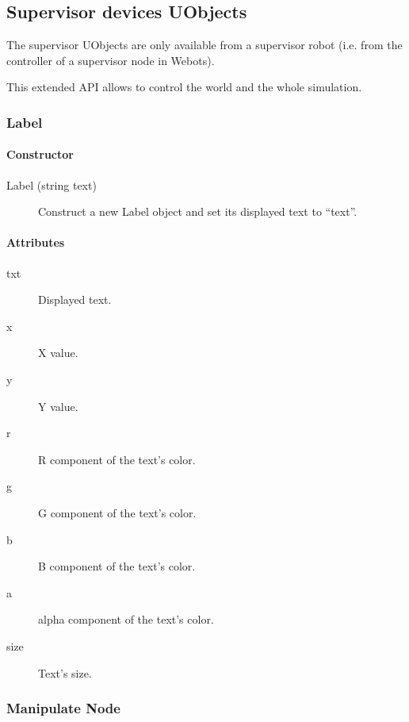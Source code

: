 \subsection{Supervisor devices UObjects}
\label{webots.uobjects.supervisor}%

 The supervisor UObjects are only available from a supervisor
robot (i.e. from the controller of a supervisor node in Webots).


 This extended API allows \urbi to control the world and the whole
simulation.


\subsubsection{Label}
\label{webots.uobjects.supervisor.label}%

\paragraph{Constructor}
\label{webots.uobjects.supervisor.label.constructor}%

\noindent
\begin{description}
\item[{Label (string text)}] Construct a new Label object and set its displayed text to ``text''.

\end{description}

\paragraph{Attributes}
\label{webots.uobjects.supervisor.label.attributes}%

\noindent
\begin{description}
\item[{txt}] Displayed text.
\item[{x}] X value.
\item[{y}] Y value.
\item[{r}] R component of the text's color.
\item[{g}] G component of the text's color.
\item[{b}] B component of the text's color.
\item[{a}] alpha component of the text's color.
\item[{size}] Text's size.
\end{description}

\subsubsection{Manipulate Node}
\label{webots.uobjects.supervisor.manipulatenode}%

